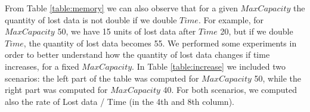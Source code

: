 From Table \ref{table:memory} we can also observe that for a given $MaxCapacity$ the quantity of lost data is not double if we double $Time$. For example, for $MaxCapacity$ 50, we have 15 units of lost data after $Time$ 20, but if we double $Time$, the quantity of lost data becomes 55. We performed some experiments in order to better understand how the quantity of lost data changes if time increases, for a fixed $MaxCapacity$. In Table \ref{table:increase} we included two scenarios: the left part of the table was computed for $MaxCapacity$ 50, while the right part was computed for $MaxCapacity$ 40. For both scenarios, we computed also the rate of Lost data / Time (in the 4th and 8th column).

\begin{table}[!htb]
\small
\begin{center}
\caption{Progression of lost data as time increases for different $MaxCapacity$ values}
\label{table:increase}
\end{center}
\end{table}

